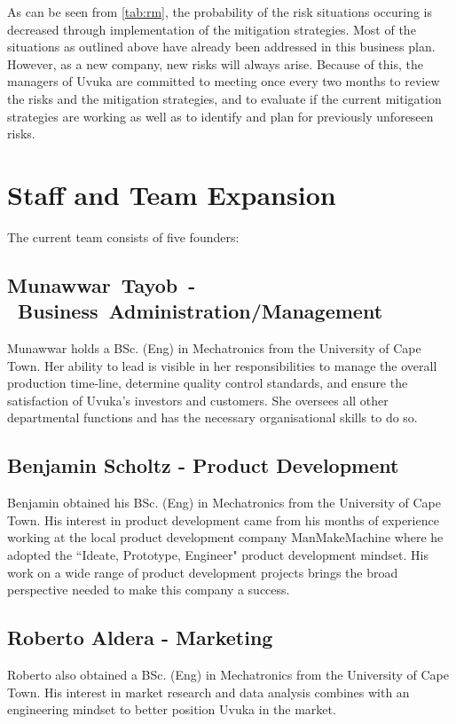 As can be seen from \cref{tab:rm}, the probability of the risk situations occuring is decreased through implementation of the mitigation strategies. Most of the situations as outlined above have already been addressed in this business plan. However, as a new company, new risks will always arise. Because of this, the managers of Uvuka are committed to meeting once every two months to review the risks and the mitigation strategies, and to evaluate if the current mitigation strategies are working as well as to identify and plan for previously unforeseen risks.



\pagebreak
\section{Staff and Team Expansion} 

The current team consists of five founders:
\subsection{Munawwar~Tayob~-~Business~Administration/Management}
Munawwar holds a BSc. (Eng) in Mechatronics from the University of Cape Town. Her ability to lead is visible in her responsibilities to manage the overall production time-line, determine quality control standards, and ensure the satisfaction of Uvuka's investors and customers. She oversees all other departmental functions and has the necessary organisational skills to do so.

\subsection{Benjamin Scholtz - Product Development}
Benjamin obtained his BSc. (Eng) in Mechatronics from the University of Cape Town. His interest in product development came from his months of experience working at the local product development company ManMakeMachine where he adopted the ``Ideate, Prototype, Engineer" product development mindset. His work on a wide range of product development projects brings the broad perspective needed to make this company a success.  

\subsection{Roberto Aldera - Marketing}
Roberto also obtained a BSc. (Eng) in Mechatronics from the University of Cape Town. His interest in market research and data analysis combines with an engineering mindset to better position Uvuka in the market.

